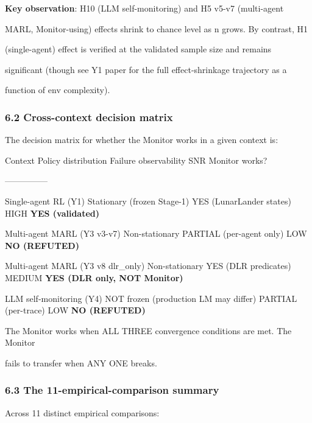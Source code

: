 \documentclass[
]{article}
\begin{document}
\textbf{Key observation}: H10 (LLM self-monitoring) and H5 v5-v7
(multi-agent

MARL, Monitor-using) effects shrink to chance level as n grows. By
contrast, H1

(single-agent) effect is verified at the validated sample size and
remains

significant (though see Y1 paper for the full effect-shrinkage
trajectory as a

function of env complexity).

\subsubsection{6.2 Cross-context decision
matrix}\label{cross-context-decision-matrix}

The decision matrix for whether the Monitor works in a given context is:

Context \textbar{} Policy distribution \textbar{} Failure observability
\textbar{} SNR \textbar{} Monitor works? \textbar{}

\textbar---\textbar---\textbar---\textbar---\textbar---\textbar{}

Single-agent RL (Y1) \textbar{} Stationary (frozen Stage-1) \textbar{}
YES (LunarLander states) \textbar{} HIGH \textbar{} \textbf{YES
(validated)} \textbar{}

Multi-agent MARL (Y3 v3-v7) \textbar{} Non-stationary \textbar{} PARTIAL
(per-agent only) \textbar{} LOW \textbar{} \textbf{NO (REFUTED)}
\textbar{}

Multi-agent MARL (Y3 v8 dlr\_only) \textbar{} Non-stationary \textbar{}
YES (DLR predicates) \textbar{} MEDIUM \textbar{} \textbf{YES (DLR only,
NOT Monitor)} \textbar{}

LLM self-monitoring (Y4) \textbar{} NOT frozen (production LM may
differ) \textbar{} PARTIAL (per-trace) \textbar{} LOW \textbar{}
\textbf{NO (REFUTED)} \textbar{}

The Monitor works when ALL THREE convergence conditions are met. The
Monitor

fails to transfer when ANY ONE breaks.

\subsubsection{6.3 The 11-empirical-comparison
summary}\label{the-11-empirical-comparison-summary}

Across 11 distinct empirical comparisons:
\end{document}
